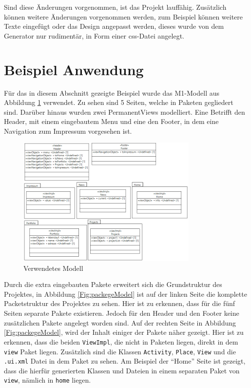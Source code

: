 Sind diese Änderungen vorgenommen, ist das Projekt lauffähig. Zusätzlich können
weitere Änderungen vorgenommen werden, zum Beispiel können weitere Texte eingefügt
oder das Design angepasst werden, dieses wurde von dem Generator nur rudimentär,
in Form einer css-Datei angelegt.

\section{Beispiel Anwendung}
Für das in diesem Abschnitt gezeigte Beispiel wurde das M1-Modell aus Abbildung
\ref{Fig:ergModell} verwendet. Zu sehen sind 5 Seiten, welche in Paketen
gegliedert sind. Darüber hinaus wurden zwei PermanentViews modelliert. Eine
Betrifft den Header, mit einem eingebautem Menu und eine den Footer, in dem
eine Navigation zum Impressum vorgesehen ist.

\begin{figure}[htbp]
\begin{center}
\includegraphics[width=0.8\textwidth]{./img/Model2.png}
\caption{Verwendetes Modell}\label{Fig:ergModell}
\end{center}
\end{figure}

Durch die extra eingebauten Pakete erweitert sich die Grundstruktur des
Projektes, in Abbildung \ref{Fig:packegeModel} ist auf der linken Seite die
komplette Packetstruktur des Projektes zu sehen. Hier ist zu erkennen, dass
für die fünf Seiten separate Pakete existieren. Jedoch für den Header und den
Footer keine zusätzlichen Pakete angelegt worden sind. Auf der rechten Seite in
Abbildung \ref{Fig:packegeModel}, wird der Inhalt einiger der Pakete näher
gezeigt. Hier ist zu erkennen, dass die beiden \texttt{ViewImpl}, die nicht in
Paketen liegen, direkt in dem \texttt{view} Paket liegen. Zusätzlich sind die
Klassen \texttt{Activity}, \texttt{Place}, \texttt{View} und die
\texttt{.ui.xml} Datei in dem Paket zu sehen. Am Beispiel der "`Home"' Seite
ist gezeigt, dass die hierfür generierten Klassen und Dateien in einem separaten
Paket von \texttt{view}, nämlich in \texttt{home} liegen.

